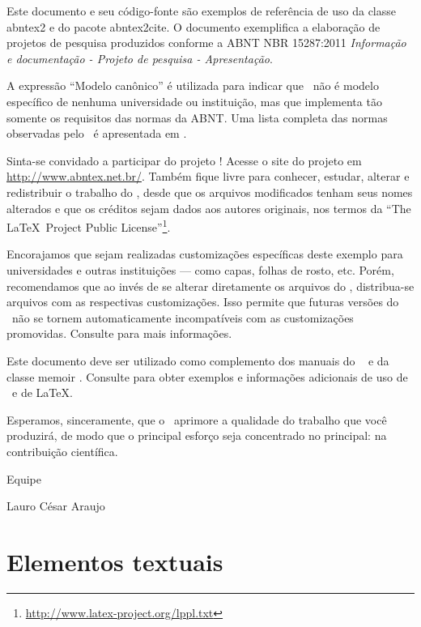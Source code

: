 \documentclass[
	12pt,				%
	openright,			%
	twoside,			%
	a4paper,			%
	english,			%
	french,				%
	spanish,			%
	brazil,				%
	]{abntex2}
\begin{document}
Este documento e seu código-fonte são exemplos de referência de uso da classe
\textsf{abntex2} e do pacote \textsf{abntex2cite}. O documento 
exemplifica a elaboração de projetos de pesquisa produzidos
conforme a ABNT NBR 15287:2011 \emph{Informação e documentação - Projeto de
pesquisa - Apresentação}. 

A expressão ``Modelo canônico'' é utilizada para indicar que \abnTeX\ não é
modelo específico de nenhuma universidade ou instituição, mas que implementa tão
somente os requisitos das normas da ABNT. Uma lista completa das normas
observadas pelo \abnTeX\ é apresentada em .

Sinta-se convidado a participar do projeto \abnTeX! Acesse o site do projeto em
\url{http://www.abntex.net.br/}. Também fique livre para conhecer,
estudar, alterar e redistribuir o trabalho do \abnTeX, desde que os arquivos
modificados tenham seus nomes alterados e que os créditos sejam dados aos
autores originais, nos termos da ``The \LaTeX\ Project Public
License''\footnote{\url{http://www.latex-project.org/lppl.txt}}.

Encorajamos que sejam realizadas customizações específicas deste exemplo para
universidades e outras instituições --- como capas, folhas de rosto, etc.
Porém, recomendamos que ao invés de se alterar diretamente os arquivos do
\abnTeX, distribua-se arquivos com as respectivas customizações.
Isso permite que futuras versões do \abnTeX~não se tornem automaticamente
incompatíveis com as customizações promovidas. Consulte
 para mais informações.

Este documento deve ser utilizado como complemento dos manuais do \abnTeX\ 
\cite{abntex2classe,abntex2cite,abntex2cite-alf} e da classe \textsf{memoir}
\cite{memoir}. Consulte \citeonline{abntex2modelo} para obter
exemplos e informações adicionais de uso de \abnTeX\ e de \LaTeX.

Esperamos, sinceramente, que o \abnTeX\ aprimore a qualidade do trabalho que
você produzirá, de modo que o principal esforço seja concentrado no principal:
na contribuição científica.

Equipe \abnTeX 

Lauro César Araujo

\chapter{Elementos textuais}
\end{document}

